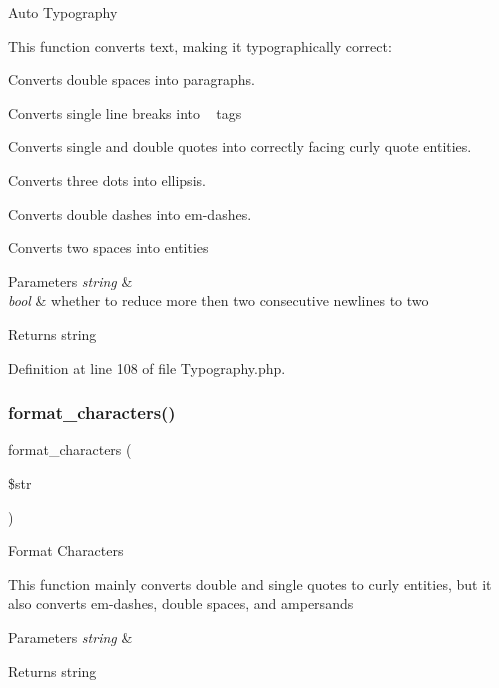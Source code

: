 Auto Typography

This function converts text, making it typographically correct\+:
\begin{DoxyItemize}
\item Converts double spaces into paragraphs.
\item Converts single line breaks into ~\newline
 tags
\item Converts single and double quotes into correctly facing curly quote entities.
\item Converts three dots into ellipsis.
\item Converts double dashes into em-\/dashes.
\item Converts two spaces into entities
\end{DoxyItemize}


\begin{DoxyParams}{Parameters}
{\em string} & \\
\hline
{\em bool} & whether to reduce more then two consecutive newlines to two \\
\hline
\end{DoxyParams}
\begin{DoxyReturn}{Returns}
string 
\end{DoxyReturn}


Definition at line 108 of file Typography.\+php.

\mbox{\label{class_c_i___typography_a45df135c8811c2b27085dbdfd05a1eed}} 
\subsubsection{\texorpdfstring{format\_characters()}{format\_characters()}}
{\footnotesize\ttfamily format\+\_\+characters (\begin{DoxyParamCaption}\item[{}]{\$str }\end{DoxyParamCaption})}

Format Characters

This function mainly converts double and single quotes to curly entities, but it also converts em-\/dashes, double spaces, and ampersands


\begin{DoxyParams}{Parameters}
{\em string} & \\
\hline
\end{DoxyParams}
\begin{DoxyReturn}{Returns}
string 
\end{DoxyReturn}


